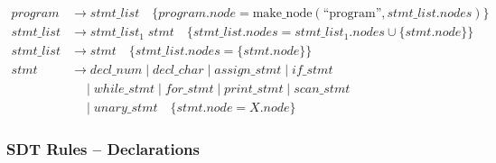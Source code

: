 \documentclass[letterpaper,12pt,oneside]{article}
\begin{document}
\begin{align*}
program &\rightarrow stmt\_list \quad \{program.node = \text{make\_node}(\text{``program''}, stmt\_list.nodes)\} \\[8pt]
stmt\_list &\rightarrow stmt\_list_1 \; stmt \quad \{stmt\_list.nodes = stmt\_list_1.nodes \cup \{stmt.node\}\} \\[4pt]
stmt\_list &\rightarrow stmt \quad \{stmt\_list.nodes = \{stmt.node\}\} \\[8pt]
stmt &\rightarrow decl\_num \mid decl\_char \mid assign\_stmt \mid if\_stmt \\
     &\quad\mid while\_stmt \mid for\_stmt \mid print\_stmt \mid scan\_stmt \\
     &\quad\mid unary\_stmt \quad \{stmt.node = X.node\}
\end{align*}

\subsubsection{SDT Rules -- Declarations}
\end{document}
